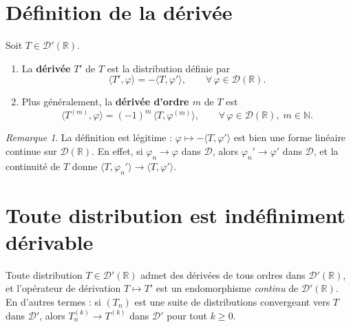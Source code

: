 \documentclass[12pt,a4paper,openany]{book}
\theoremstyle{definition}
\theoremstyle{plain}
\theoremstyle{remark}
\newtheorem*{remark}{Remarque}
\newenvironment{remarque}{\begin{remark}}{\end{remark}}
\begin{document}
	\section{Définition de la dérivée}
	
	\begin{definition}
		Soit $T \in \mathcal{D}'(\mathbb{R})$.
		\begin{enumerate}
			\item La \textbf{dérivée} $T'$ de $T$ est la distribution définie par
			\[
			\langle T', \varphi \rangle = -\langle T, \varphi' \rangle,
			\qquad \forall\,\varphi \in \mathcal{D}(\mathbb{R}).
			\]
			\item Plus généralement, la \textbf{dérivée d'ordre $m$} de $T$ est
			\[
			\langle T^{(m)}, \varphi \rangle = (-1)^m\,\langle T, \varphi^{(m)} \rangle,
			\qquad \forall\,\varphi \in \mathcal{D}(\mathbb{R}),\; m \in \mathbb{N}.
			\]
		\end{enumerate}
	\end{definition}
	
	\begin{remarque}
		La définition est légitime : $\varphi \mapsto -\langle T, \varphi'\rangle$ est bien une forme linéaire continue sur $\mathcal{D}(\mathbb{R})$. En effet, si $\varphi_n \to \varphi$ dans $\mathcal{D}$, alors $\varphi_n' \to \varphi'$ dans $\mathcal{D}$, et la continuité de $T$ donne
		$\langle T, \varphi_n'\rangle \to \langle T, \varphi'\rangle$.
	\end{remarque}
	
	\section{Toute distribution est indéfiniment dérivable}
	
	\begin{theorem}
		Toute distribution $T \in \mathcal{D}'(\mathbb{R})$ admet des dérivées de tous ordres dans $\mathcal{D}'(\mathbb{R})$, et l'opérateur de dérivation $T \mapsto T'$ est un endomorphisme \emph{continu} de $\mathcal{D}'(\mathbb{R})$.
		En d'autres termes : si $(T_n)$ est une suite de distributions convergeant vers $T$ dans $\mathcal{D}'$, alors $T_n^{(k)} \to T^{(k)}$ dans $\mathcal{D}'$ pour tout $k \geq 0$.
	\end{theorem}
	
\end{document}
